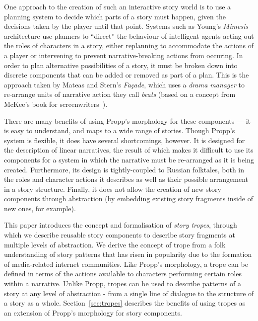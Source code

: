 \documentclass{article}
\begin{document}
One approach to the creation of such an interactive story world is to use a
planning system to decide which parts of a story must happen, given the
decisions taken by the player until that point. Systems such as Young's
\emph{Mimesis}~\cite{young2004architecture} architecture use planners to
``direct'' the behaviour of intelligent agents acting out the roles of
characters in a story, either replanning to accommodate the actions of a player
or intervening to prevent narrative-breaking actions from occuring. In order to
plan alternative possibilities of a story, it must be broken down into discrete
components that can be added or removed as part of a plan. This is the approach
taken by Mateas and Stern's \emph{Fa\c{c}ade}, which uses a \emph{drama manager}
to re-arrange units of narrative action they call \emph{beats} (based on a
concept from McKee's book for screenwriters~\cite{mckee1997substance}).

There are many benefits of using Propp's morphology for these
components --- it is easy to understand, and maps to a wide range of stories.
Though Propp's system is flexible, it does have several shortcomings, however.
It is designed for the description of linear narratives, the result of which
makes it difficult to use its components for a system in which the narrative
must be re-arranged as it is being created. Furthermore, its design is
tightly-coupled to Russian folktales, both in the roles and character actions it
describes as well as their possible arrangement in a story structure. Finally,
it does not allow the creation of new story components through abstraction (by
embedding existing story fragments inside of new ones, for example).

This paper introduces the concept and formalisation of \emph{story tropes},
through which we describe reusable story components to describe story fragments
at multiple levels of abstraction. We derive the concept of trope from a folk
understanding of story patterns that has risen in popularity due to the
formation of media-related internet communities. Like Propp's morphology, a
trope can be defined in terms of the actions available to characters performing
certain roles within a narrative. Unlike Propp, tropes can be used to describe
patterns of a story at any level of abstraction - from a single line of dialogue
to the structure of a story as a whole. Section~\ref{sec:tropes} describes the
benefits of using tropes as an extension of Propp's morphology for story components.
\end{document}

